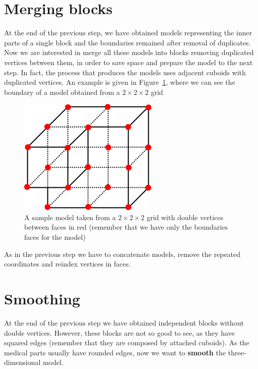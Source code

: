 \section{Merging blocks}\label{sec33:Blocks}

At the end of the previous step, we have obtained models representing the inner parts of a single block and the boundaries remained after removal of duplicates. Now we are interested in merge all these models into blocks removing duplicated vertices between them, in order to save space and prepare the model to the next step. In fact, the process that produces the models uses adjacent cuboids with duplicated vertices. An example is given in Figure~\ref{fig:duplicates}, where we can see the boundary of a model obtained from a $2 \times 2 \times 2$ grid

\begin{figure}[htb] %
   \centering
   \includegraphics[width=0.25\linewidth]{images/duplicates.png}
   \caption[Sample model with double vertices]{A sample model taken from a $2 \times 2 \times 2$ grid with double vertices between faces in red (remember that we have only the boundaries faces for the model)}
   \label{fig:duplicates}
\end{figure}

As in the previous step we have to concatenate models, remove the repeated coordinates and reindex vertices in faces.

\section{Smoothing}\label{sec33:Smoothing}

At the end of the previous step we have obtained independent blocks without double vertices. However, these blocks are not so good to see, as they have squared edges (remember that they are composed by attached cuboids). As the medical parts usually have rounded edges, now we want to \textbf{smooth} the three-dimensional model.\\

